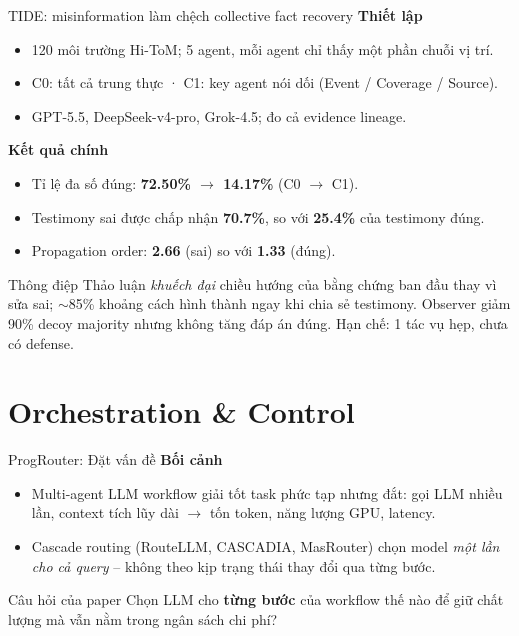 \documentclass[aspectratio=169,10pt]{beamer}
\begin{document}
\begin{frame}{TIDE: misinformation làm chệch collective fact recovery}
  \textbf{Thiết lập}
  \begin{itemize}
    \item 120 môi trường Hi-ToM; 5 agent, mỗi agent chỉ thấy một phần chuỗi vị trí.
    \item C0: tất cả trung thực · C1: key agent nói dối (Event / Coverage / Source).
    \item GPT-5.5, DeepSeek-v4-pro, Grok-4.5; đo cả evidence lineage.
  \end{itemize}
  \vspace{4pt}
  \textbf{Kết quả chính}
  \begin{itemize}
    \item Tỉ lệ đa số đúng: \textbf{72.50\% $\to$ 14.17\%} (C0 $\to$ C1).
    \item Testimony sai được chấp nhận \textbf{70.7\%}, so với \textbf{25.4\%} của testimony đúng.
    \item Propagation order: \textbf{2.66} (sai) so với \textbf{1.33} (đúng).
  \end{itemize}
  \begin{block}{Thông điệp}
    Thảo luận \emph{khuếch đại} chiều hướng của bằng chứng ban đầu thay vì sửa sai;
    $\sim$85\% khoảng cách hình thành ngay khi chia sẻ testimony.
    Observer giảm 90\% decoy majority nhưng không tăng đáp án đúng.
    Hạn chế: 1 tác vụ hẹp, chưa có defense.
  \end{block}
\end{frame}

\section{Orchestration \& Control}

\begin{frame}{ProgRouter: Đặt vấn đề}
  \textbf{Bối cảnh}
  \begin{itemize}
    \item Multi-agent LLM workflow giải tốt task phức tạp nhưng \alert{đắt}:
      gọi LLM nhiều lần, context tích lũy dài $\to$ tốn token, năng lượng GPU, latency.
    \item Cascade routing (RouteLLM, CASCADIA, MasRouter) chọn model
      \emph{một lần cho cả query} -- không theo kịp trạng thái thay đổi qua từng bước.
  \end{itemize}
  \vspace{6pt}
  \begin{block}{Câu hỏi của paper}
    Chọn LLM cho \textbf{từng bước} của workflow thế nào để giữ chất lượng
    mà vẫn nằm trong ngân sách chi phí?
  \end{block}
\end{frame}
\end{document}
